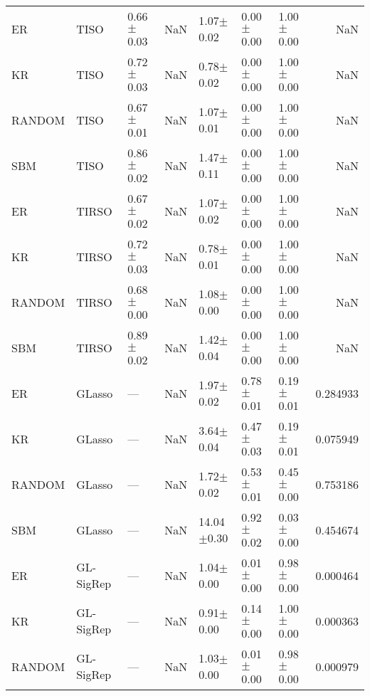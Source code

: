 \begin{tabular}{lllllllr}
ER & TISO & 0.66{\scriptsize$\pm$0.03} & NaN & 1.07{\scriptsize$\pm$0.02} & 0.00{\scriptsize$\pm$0.00} & 1.00{\scriptsize$\pm$0.00} & NaN \\
KR & TISO & 0.72{\scriptsize$\pm$0.03} & NaN & 0.78{\scriptsize$\pm$0.02} & 0.00{\scriptsize$\pm$0.00} & 1.00{\scriptsize$\pm$0.00} & NaN \\
RANDOM & TISO & 0.67{\scriptsize$\pm$0.01} & NaN & 1.07{\scriptsize$\pm$0.01} & 0.00{\scriptsize$\pm$0.00} & 1.00{\scriptsize$\pm$0.00} & NaN \\
SBM & TISO & 0.86{\scriptsize$\pm$0.02} & NaN & 1.47{\scriptsize$\pm$0.11} & 0.00{\scriptsize$\pm$0.00} & 1.00{\scriptsize$\pm$0.00} & NaN \\
ER & TIRSO & 0.67{\scriptsize$\pm$0.02} & NaN & 1.07{\scriptsize$\pm$0.02} & 0.00{\scriptsize$\pm$0.00} & 1.00{\scriptsize$\pm$0.00} & NaN \\
KR & TIRSO & 0.72{\scriptsize$\pm$0.03} & NaN & 0.78{\scriptsize$\pm$0.01} & 0.00{\scriptsize$\pm$0.00} & 1.00{\scriptsize$\pm$0.00} & NaN \\
RANDOM & TIRSO & 0.68{\scriptsize$\pm$0.00} & NaN & 1.08{\scriptsize$\pm$0.00} & 0.00{\scriptsize$\pm$0.00} & 1.00{\scriptsize$\pm$0.00} & NaN \\
SBM & TIRSO & 0.89{\scriptsize$\pm$0.02} & NaN & 1.42{\scriptsize$\pm$0.04} & 0.00{\scriptsize$\pm$0.00} & 1.00{\scriptsize$\pm$0.00} & NaN \\
ER & GLasso & --- & NaN & 1.97{\scriptsize$\pm$0.02} & 0.78{\scriptsize$\pm$0.01} & 0.19{\scriptsize$\pm$0.01} & 0.284933 \\
KR & GLasso & --- & NaN & 3.64{\scriptsize$\pm$0.04} & 0.47{\scriptsize$\pm$0.03} & 0.19{\scriptsize$\pm$0.01} & 0.075949 \\
RANDOM & GLasso & --- & NaN & 1.72{\scriptsize$\pm$0.02} & 0.53{\scriptsize$\pm$0.01} & 0.45{\scriptsize$\pm$0.00} & 0.753186 \\
SBM & GLasso & --- & NaN & 14.04{\scriptsize$\pm$0.30} & 0.92{\scriptsize$\pm$0.02} & 0.03{\scriptsize$\pm$0.00} & 0.454674 \\
ER & GL-SigRep & --- & NaN & 1.04{\scriptsize$\pm$0.00} & 0.01{\scriptsize$\pm$0.00} & 0.98{\scriptsize$\pm$0.00} & 0.000464 \\
KR & GL-SigRep & --- & NaN & 0.91{\scriptsize$\pm$0.00} & 0.14{\scriptsize$\pm$0.00} & 1.00{\scriptsize$\pm$0.00} & 0.000363 \\
RANDOM & GL-SigRep & --- & NaN & 1.03{\scriptsize$\pm$0.00} & 0.01{\scriptsize$\pm$0.00} & 0.98{\scriptsize$\pm$0.00} & 0.000979 \\

\end{tabular}
